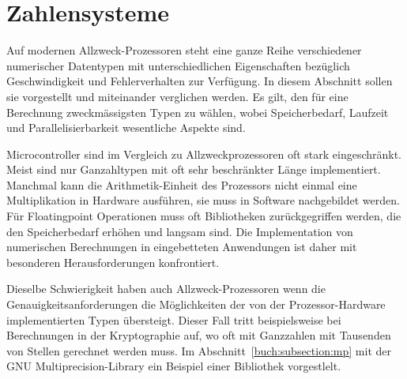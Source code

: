 %
%
%
\section{Zahlensysteme
\label{buch:section:zahlensysteme}}
Auf modernen Allzweck-Prozessoren steht eine ganze Reihe verschiedener
numerischer Datentypen mit unterschiedlichen Eigenschaften
bezüglich Geschwindigkeit und Fehlerverhalten zur Verfügung.
In diesem Abschnitt sollen sie vorgestellt und miteinander verglichen
werden.
Es gilt, den für eine Berechnung zweckmässigsten Typen zu wählen,
wobei Speicherbedarf, Laufzeit und Parallelisierbarkeit wesentliche
Aspekte sind.

Microcontroller sind im Vergleich zu Allzweckprozessoren oft stark
%
eingeschränkt.
Meist sind nur Ganzahltypen mit oft sehr beschränkter Länge implementiert.
Manchmal kann die Arithmetik-Einheit des Prozessors nicht einmal eine
Multiplikation in Hardware ausführen, sie muss in Software nachgebildet
werden.
Für Floatingpoint Operationen muss oft Bibliotheken zurückgegriffen
werden, die den Speicherbedarf erhöhen und langsam sind.
Die Implementation von numerischen Berechnungen in eingebetteten Anwendungen
ist daher mit besonderen Herausforderungen konfrontiert.

Dieselbe Schwierigkeit haben auch Allzweck-Prozessoren wenn die
Genauigkeitsanforderungen die Möglichkeiten der von der Prozessor-Hardware
implementierten Typen übersteigt.
Dieser Fall tritt beispielsweise bei Berechnungen in der Kryptographie auf,
wo oft mit Ganzzahlen mit Tausenden von Stellen gerechnet werden muss.
Im Abschnitt~\ref{buch:subsection:mp} mit der GNU Multiprecision-Library
ein Beispiel einer Bibliothek vorgestlelt.


